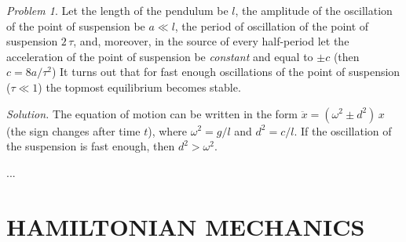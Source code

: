 \documentclass[leqno]{report}
\numberwithin{equation}{section}
\theoremstyle{plain}
\theoremstyle{definition}
\theoremstyle{remark}
\theoremstyle{smallcap}
\newtheorem*{prob*}{Problem}
\numberwithin{prob}{section}
\newcommand{\solution}[1]{\textit{Solution.} #1}
\begin{document}
\begin{prob*}
  Let the length of the pendulum be $l$,
  the amplitude of the oscillation of the point of suspension
  be $a \ll l$,
  the period of oscillation of the point of suspension $2 \,\tau$,
  and, moreover,
  in the source of every half-period let the acceleration
  of the point of suspension be \emph{constant} and equal to $\pm c$
  (then $c = 8a/\tau^2$)
  It turns out that for fast enough oscillations of the point
  of suspension ($\tau \ll 1$)
  the topmost equilibrium becomes stable.

  \solution{
    The equation of motion can be written in the form
    $\ddot x = (\omega^2 \pm d^2) \, x$
    (the sign changes after time $t$),
    where $\omega^2 = g/l$
    and $d^2 = c/l$.
    If the oscillation of the suspension is fast enough,
    then $d^2 > \omega^2$.

    ...
  }
\end{prob*}

%
%
%
%
%
%

\part{HAMILTONIAN MECHANICS}
\end{document}
